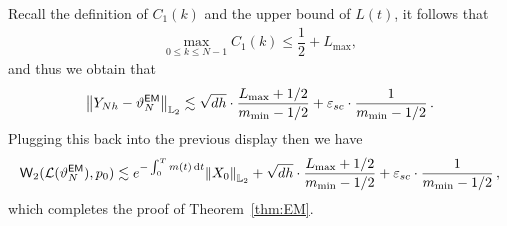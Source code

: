 Recall the definition of $C_1(k)$ and the upper bound of $L(t)$, it follows that
\begin{align*}
    \max_{0\leqslant k\leqslant N-1}C_1(k)\leqslant \dfrac{1}{2}+L_{\max},
\end{align*}
and thus we obtain that
\begin{align*}
    \l|Y_{Nh}-\vartheta_N^{\sf EM}\r|_{\Ltwo}\lesssim \sqrt{dh}\cdot\dfrac{L_{\max}+1/2}{m_{\min}-1/2}+\varepsilon_{sc}\cdot\dfrac{1}{m_{\min}-1/2}\,.
\end{align*}
Plugging this back into the previous display then we have
\begin{align*}
    \wass_2(\law(\vartheta_N^{\sf EM}),p_0)\lesssim e^{-\int_0^Tm(t)\rmd t}\l|X_0\r|_{\Ltwo}+\sqrt{dh}\cdot\dfrac{L_{\max}+1/2}{m_{\min}-1/2}+\varepsilon_{sc}\cdot \dfrac{1}{m_{\min}-1/2}\,,
\end{align*}
which completes the proof of Theorem~\ref{thm:EM}.


